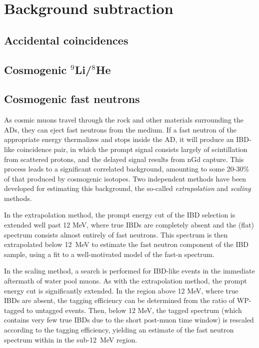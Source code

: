 \documentclass[../thesis.tex]{subfiles}
\begin{document}
\chapter{Background subtraction}
\label{chap:bkg}

\section{Accidental coincidences}

\section{Cosmogenic $^9$Li/$^8$He}

\section{Cosmogenic fast neutrons}

As cosmic muons travel through the rock and other materials surrounding the ADs, they can eject fast neutrons from the medium. If a fast neutron of the appropriate energy thermalizes and stops inside the AD, it will produce an IBD-like coincidence pair, in which the prompt signal consists largely of scintillation from scattered protons, and the delayed signal results from nGd capture. This process leads to a significant correlated background, amounting to some 20-30\% of that produced by cosmogenic isotopes. Two independent methods have been developed for estimating this background, the so-called \emph{extrapolation} and \emph{scaling} methods.

In the extrapolation method, the prompt energy cut of the IBD selection is extended well past 12 MeV, where true IBDs are completely absent and the (flat) spectrum consists almost entirely of fast neutrons. This spectrum is then extrapolated below 12~MeV to estimate the fast neutron component of the IBD sample, using a fit to a well-motivated model of the fast-n spectrum.

In the scaling method, a search is performed for IBD-like events in the immediate aftermath of water pool muons. As with the extrapolation method, the prompt energy cut is significantly extended. In the region above 12 MeV, where true IBDs are absent, the tagging efficiency can be determined from the ratio of WP-tagged to untagged events. Then, below 12 MeV, the tagged spectrum (which contains very few true IBDs due to the short post-muon time window) is rescaled according to the tagging efficiency, yielding an estimate of the fast neutron spectrum within in the sub-12~MeV region.
\end{document}
